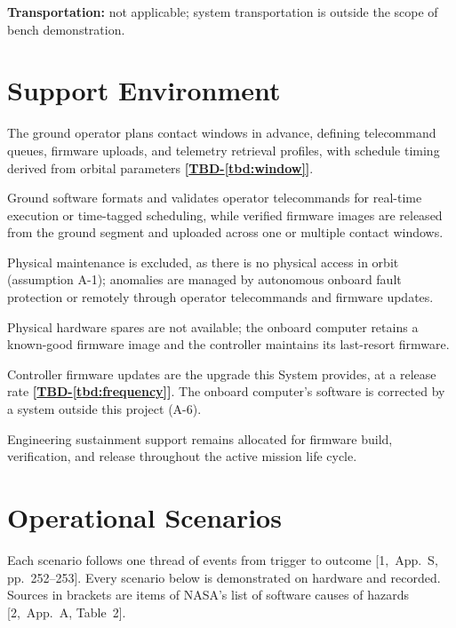 \documentclass[11pt,a4paper]{article}
\newcommand{\tbd}[1]{\mbox{\textbf{[\hyperref[tbd:#1]{TBD-\ref*{tbd:#1}}]}}}
\begin{document}
\medskip
\noindent\textbf{Transportation:} not applicable; system transportation is
outside the scope of bench demonstration.

\section{Support Environment}
\begin{description}[leftmargin=4.4cm]
\item[Operational planning] The ground operator plans contact windows in
  advance, defining telecommand queues, firmware uploads, and telemetry
  retrieval profiles, with schedule timing derived from orbital parameters
  \tbd{window}.
\item[Commanding and uploads] Ground software formats and validates operator
  telecommands for real-time execution or time-tagged scheduling, while
  verified firmware images are released from the ground segment and uploaded
  across one or multiple contact windows.
\item[Maintenance and repair] Physical maintenance is excluded, as there is no
  physical access in orbit (assumption A-1); anomalies are managed by
  autonomous onboard fault protection or remotely through operator
  telecommands and firmware updates.
\item[Sparing] Physical hardware spares are not available; the onboard
  computer retains a known-good firmware image and the controller maintains
  its last-resort firmware.
\item[Upgrades] Controller firmware updates are the upgrade this System
  provides, at a release rate \tbd{frequency}. The onboard computer's software
  is corrected by a system outside this project (A-6).
\item[Continued support] Engineering sustainment support remains allocated for
  firmware build, verification, and release throughout the active mission
  life cycle.
\end{description}

\section{Operational Scenarios}
Each scenario follows one thread of events from trigger to outcome
[1,~App.~S, pp.~252--253]. Every scenario below is demonstrated on hardware and
recorded. Sources in brackets are items of NASA's list of software causes of
hazards [2,~App.~A, Table~2].
\end{document}
